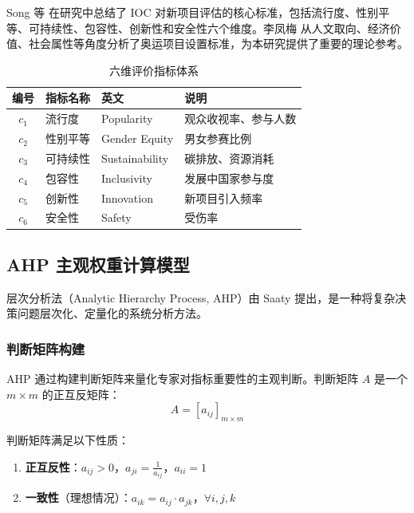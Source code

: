 Song 等\cite{song2025quantifying} 在研究中总结了 IOC 对新项目评估的核心标准，包括流行度、性别平等、可持续性、包容性、创新性和安全性六个维度。李凤梅\cite{li2013xiaji} 从人文取向、经济价值、社会属性等角度分析了奥运项目设置标准，为本研究提供了重要的理论参考。

\begin{table}[htbp]
    \centering
    \caption{六维评价指标体系}
    \label{tab:indicators}
    \begin{tabular}{clll}
        \toprule
        编号 & 指标名称 & 英文 & 说明 \\
        \midrule
        $c_1$ & 流行度 & Popularity & 观众收视率、参与人数 \\
        $c_2$ & 性别平等 & Gender Equity & 男女参赛比例 \\
        $c_3$ & 可持续性 & Sustainability & 碳排放、资源消耗 \\
        $c_4$ & 包容性 & Inclusivity & 发展中国家参与度 \\
        $c_5$ & 创新性 & Innovation & 新项目引入频率 \\
        $c_6$ & 安全性 & Safety & 受伤率 \\
        \bottomrule
    \end{tabular}
\end{table}

\subsection{AHP 主观权重计算模型}
\label{subsec:ahp}

层次分析法（Analytic Hierarchy Process, AHP）由 Saaty\cite{saaty2007analytic} 提出，是一种将复杂决策问题层次化、定量化的系统分析方法。

\subsubsection{判断矩阵构建}

AHP 通过构建判断矩阵来量化专家对指标重要性的主观判断。判断矩阵 $A$ 是一个 $m \times m$ 的正互反矩阵\cite{saaty2007analytic}：
\begin{equation}
    A = [a_{ij}]_{m \times m}
    \label{eq:jm}
\end{equation}

判断矩阵满足以下性质：
\begin{enumerate}
    \item \textbf{正互反性}：$a_{ij} > 0$，$a_{ji} = \frac{1}{a_{ij}}$，$a_{ii} = 1$
    \item \textbf{一致性}（理想情况）：$a_{ik} = a_{ij} \cdot a_{jk}$，$\forall i, j, k$
\end{enumerate}

